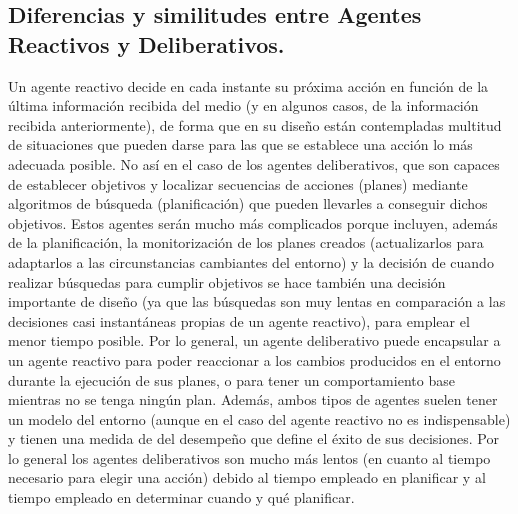 \documentclass[a4paper, 11pt]{article}
\begin{document}
\subsection{Diferencias y similitudes entre Agentes Reactivos y Deliberativos.}
Un agente reactivo decide en cada instante su próxima acción en función de la última información recibida del medio (y en algunos casos, de la información recibida anteriormente), de forma que en su diseño están contempladas multitud de situaciones que pueden darse para las que se establece una acción lo más adecuada posible. No así en el caso de los agentes deliberativos, que son capaces de establecer objetivos y localizar secuencias de acciones (planes) mediante algoritmos de búsqueda (planificación) que pueden llevarles a conseguir dichos objetivos. Estos agentes serán mucho más complicados porque incluyen, además de la planificación, la monitorización de los planes creados (actualizarlos para adaptarlos a las circunstancias cambiantes del entorno) y la decisión de cuando realizar búsquedas para cumplir objetivos se hace también una decisión importante de diseño (ya que las búsquedas son muy lentas en comparación a las decisiones casi instantáneas propias de un agente reactivo), para emplear el menor tiempo posible. 
Por lo general, un agente deliberativo puede encapsular a un agente reactivo para poder reaccionar a los cambios producidos en el entorno durante la ejecución de sus planes, o para tener un comportamiento base mientras no se tenga ningún plan. Además, ambos tipos de agentes suelen tener un modelo del entorno (aunque en el caso del agente reactivo no es indispensable) y 	tienen una medida de del desempeño que define el éxito de sus decisiones. Por lo general los agentes deliberativos son mucho más lentos (en cuanto al tiempo necesario para elegir una acción) debido al tiempo empleado en planificar y al tiempo empleado en determinar cuando y qué planificar.
\end{document}
